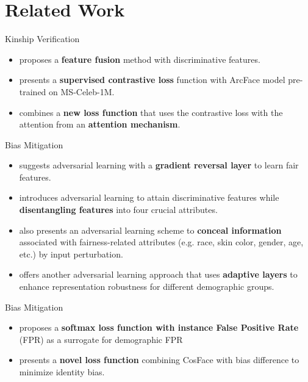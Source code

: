 \documentclass[aspectratio=169,xcolor=dvipsnames]{beamer}
\begin{document}
\section{Related Work}

\begin{frame}{Kinship Verification}
    \begin{itemize}
        \item \cite{R44} proposes a \textbf{feature fusion} method with discriminative features.
        \item \cite{R46} presents a \textbf{supervised contrastive loss} function with ArcFace model pre-trained on MS-Celeb-1M.
        \item \cite{R31} combines a \textbf{new loss function} that uses the contrastive loss with the attention from an \textbf{attention mechanism}. 
    \end{itemize}
\end{frame}


\begin{frame}{Bias Mitigation}
    \begin{itemize}
        \item \cite{R24} suggests adversarial learning with a \textbf{gradient reversal layer} to learn fair features.
        \item \cite{R10} introduces adversarial learning to attain discriminative features while \textbf{disentangling features} into four crucial attributes.
        \item \cite{R39} also presents an adversarial learning scheme to \textbf{conceal information} associated with fairness-related attributes (e.g. race, skin color, gender, age, etc.) by input perturbation.
        \item \cite{R11} offers another adversarial learning approach that uses \textbf{adaptive layers} to enhance representation robustness for different demographic groups.
    \end{itemize}
\end{frame}


\begin{frame}{Bias Mitigation}
    \begin{itemize}
        \item \cite{R42} proposes a \textbf{softmax loss function with instance False Positive Rate} (FPR) as a surrogate for demographic FPR
        \item \cite{R35} presents a \textbf{novel loss function} combining CosFace with bias difference to minimize identity bias.
    \end{itemize}
\end{frame}
\end{document}

